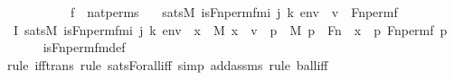 \begin{isabellebody}
\ \ \ \ \ \ \ \ \ \ {\isachardoublequoteopen}f\ {\isasymin}\ nat{\isacharunderscore}{\kern0pt}perms{\isachardoublequoteclose}\isanewline
\ \ \ {\isachardoublequoteopen}sats{\isacharparenleft}{\kern0pt}M{\isacharcomma}{\kern0pt}\ is{\isacharunderscore}{\kern0pt}Fn{\isacharunderscore}{\kern0pt}perm{\isacharprime}{\kern0pt}{\isacharunderscore}{\kern0pt}fm{\isacharparenleft}{\kern0pt}i{\isacharcomma}{\kern0pt}\ j{\isacharcomma}{\kern0pt}\ k{\isacharparenright}{\kern0pt}{\isacharcomma}{\kern0pt}\ env{\isacharparenright}{\kern0pt}\ {\isasymlongleftrightarrow}\ v\ {\isacharequal}{\kern0pt}\ Fn{\isacharunderscore}{\kern0pt}perm{\isacharprime}{\kern0pt}{\isacharparenleft}{\kern0pt}f{\isacharparenright}{\kern0pt}{\isachardoublequoteclose}\isanewline
%
\isadelimproof
%
\endisadelimproof
%
\isatagproof
{}\isamarkupfalse%
\ {\isacharminus}{\kern0pt}\ \isanewline
\ \ \isamarkupfalse%
\ I{}{\isacharcolon}{\kern0pt}\ {\isachardoublequoteopen}sats{\isacharparenleft}{\kern0pt}M{\isacharcomma}{\kern0pt}\ is{\isacharunderscore}{\kern0pt}Fn{\isacharunderscore}{\kern0pt}perm{\isacharprime}{\kern0pt}{\isacharunderscore}{\kern0pt}fm{\isacharparenleft}{\kern0pt}i{\isacharcomma}{\kern0pt}\ j{\isacharcomma}{\kern0pt}\ k{\isacharparenright}{\kern0pt}{\isacharcomma}{\kern0pt}\ env{\isacharparenright}{\kern0pt}\ {\isasymlongleftrightarrow}\ {\isacharparenleft}{\kern0pt}{\isasymforall}x\ {\isasymin}\ M{\isachardot}{\kern0pt}\ x\ {\isasymin}\ v\ {\isasymlongleftrightarrow}\ {\isacharparenleft}{\kern0pt}{\isasymexists}p\ {\isasymin}\ M{\isachardot}{\kern0pt}\ p\ {\isasymin}\ Fn\ {\isasymand}\ x\ {\isacharequal}{\kern0pt}\ {\isacharless}{\kern0pt}p{\isacharcomma}{\kern0pt}\ Fn{\isacharunderscore}{\kern0pt}perm{\isacharparenleft}{\kern0pt}f{\isacharcomma}{\kern0pt}\ p{\isacharparenright}{\kern0pt}{\isachargreater}{\kern0pt}{\isacharparenright}{\kern0pt}{\isacharparenright}{\kern0pt}{\isachardoublequoteclose}\ \isanewline
\ \ \ \ \isamarkupfalse%
\ is{\isacharunderscore}{\kern0pt}Fn{\isacharunderscore}{\kern0pt}perm{\isacharprime}{\kern0pt}{\isacharunderscore}{\kern0pt}fm{\isacharunderscore}{\kern0pt}def\ \isanewline
\ \ \ \ \isamarkupfalse%
{\isacharparenleft}{\kern0pt}rule\ iff{\isacharunderscore}{\kern0pt}trans{\isacharcomma}{\kern0pt}\ rule\ sats{\isacharunderscore}{\kern0pt}Forall{\isacharunderscore}{\kern0pt}iff{\isacharcomma}{\kern0pt}\ simp\ add{\isacharcolon}{\kern0pt}assms{\isacharcomma}{\kern0pt}\ rule\ ball{\isacharunderscore}{\kern0pt}iff{\isacharparenright}{\kern0pt}\isanewline

\end{isabellebody}
